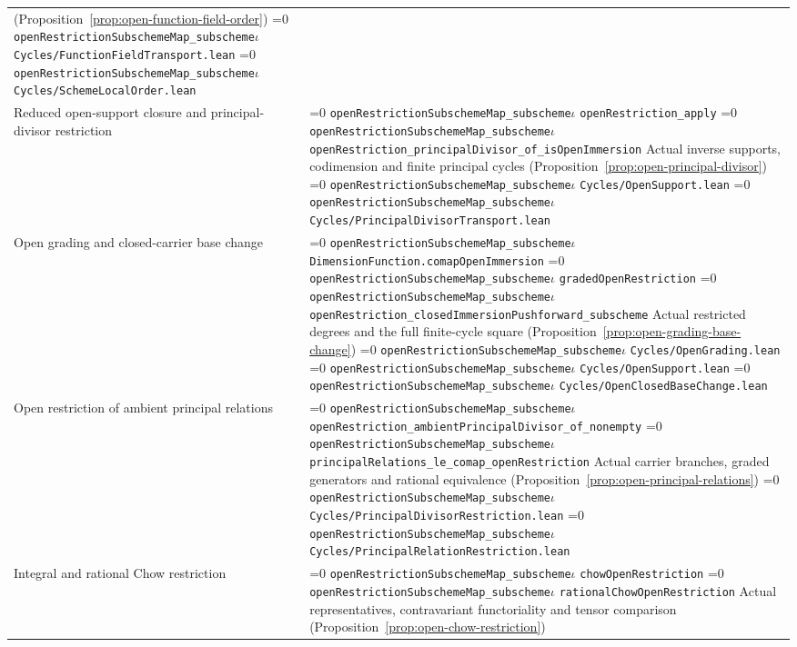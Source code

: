 \documentclass[11pt]{article}
\theoremstyle{definition}
\theoremstyle{remark}
\newcommand{\leanpath}[1]{%
  \ifnum\pdfstrcmp{\detokenize{#1}}%
      {\detokenize{openRestrictionSubschemeMap_subschemeι}}=0
    \texttt{\nolinkurl{openRestrictionSubschemeMap_subscheme}}\ensuremath{\iota}%
  \else
    \texttt{\nolinkurl{#1}}%
  \fi}
\begin{document}
\begin{longtable}{@{}>{\raggedright\arraybackslash}p{}
                >{\raggedright\arraybackslash}p{}@{}}
(Proposition~\ref{prop:open-function-field-order})\newline
\leanpath{Cycles/FunctionFieldTransport.lean}\newline
\leanpath{Cycles/SchemeLocalOrder.lean}\\
Reduced open-support closure and principal-divisor restriction &
\leanpath{openRestriction_apply}\newline
\leanpath{openRestriction_principalDivisor_of_isOpenImmersion}\newline
Actual inverse supports, codimension and finite principal cycles
(Proposition~\ref{prop:open-principal-divisor})\newline
\leanpath{Cycles/OpenSupport.lean}\newline
\leanpath{Cycles/PrincipalDivisorTransport.lean}\\
Open grading and closed-carrier base change &
\leanpath{DimensionFunction.comapOpenImmersion}\newline
\leanpath{gradedOpenRestriction}\newline
\leanpath{openRestriction_closedImmersionPushforward_subscheme}\newline
Actual restricted degrees and the full finite-cycle square
(Proposition~\ref{prop:open-grading-base-change})\newline
\leanpath{Cycles/OpenGrading.lean}\newline
\leanpath{Cycles/OpenSupport.lean}\newline
\leanpath{Cycles/OpenClosedBaseChange.lean}\\
Open restriction of ambient principal relations &
\leanpath{openRestriction_ambientPrincipalDivisor_of_nonempty}\newline
\leanpath{principalRelations_le_comap_openRestriction}\newline
Actual carrier branches, graded generators and rational equivalence
(Proposition~\ref{prop:open-principal-relations})\newline
\leanpath{Cycles/PrincipalDivisorRestriction.lean}\newline
\leanpath{Cycles/PrincipalRelationRestriction.lean}\\
Integral and rational Chow restriction &
\leanpath{chowOpenRestriction}\newline
\leanpath{rationalChowOpenRestriction}\newline
Actual representatives, contravariant functoriality and tensor comparison
(Proposition~\ref{prop:open-chow-restriction})\newline

\end{longtable}
\end{document}
